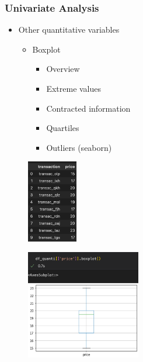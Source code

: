 \begin{frame}\frametitle{Univariate Analysis}
   \begin{minipage}{0.48\linewidth}
      \begin{itemize}
         \item Other quantitative variables
         \begin{itemize}
            \item Boxplot
            \begin{itemize}
               \item Overview
               \item Extreme values
               \item Contracted information
               \item Quartiles
               \item Outliers (seaborn)
            \end{itemize}
         \end{itemize}
      \end{itemize}
      \vspace{.5cm}
      \begin{figure}[H]
         \includegraphics[width=2.2cm]{../images/illustrations/pattern_univariate_quantitative_df.png}
      \end{figure}
   \end{minipage}
   \begin{minipage}{0.48\linewidth}
      \begin{figure}[H]
         \includegraphics[width=5cm]{../images/illustrations/pattern_univariate_quantitative_boxplot.png}
      \end{figure}
   \end{minipage}
\end{frame}


